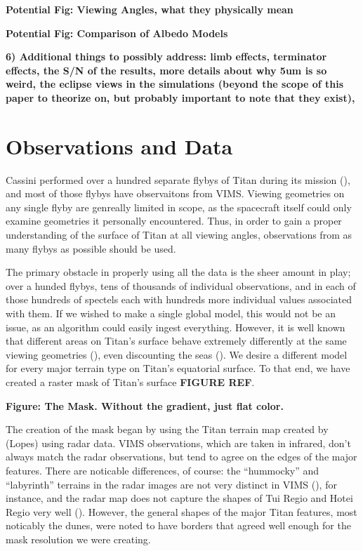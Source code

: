 \documentclass[twocolumn,linenumbers]{aastex631}
\begin{document}
\textbf{\color{blue}Potential Fig: Viewing Angles, what they physically mean\color{black}}

\textbf{\color{blue}Potential Fig: Comparison of Albedo Models\color{black}}

\textbf{\color{blue}6) Additional things to possibly address: limb effects, terminator effects, the S/N of the results, more details about why 5um is so weird, the eclipse views in the simulations (beyond the scope of this paper to theorize on, but probably important to note that they exist), \color{black}}

\section{Observations and Data} \label{sec:observe}

Cassini performed over a hundred separate flybys of Titan during its mission (), and most of those flybys have observaitons from VIMS. Viewing geometries on any single flyby are genreally limited in scope, as the spacecraft itself could only examine geometries it personally encountered. Thus, in order to gain a proper understanding of the surface of Titan at all viewing angles, observations from as many flybys as possible should be used. 

The primary obstacle in properly using all the data is the sheer amount in play; over a hunded flybys, tens of thousands of individual observations, and in each of those hundreds of spectels each with hundreds more individual values associated with them. If we wished to make a single global model, this would not be an issue, as an algorithm could easily ingest everything. However, it is well known that different areas on Titan's surface behave extremely differently at the same viewing geometries (), even discounting the seas (). We desire a different model for every major terrain type on Titan's equatorial surface. To that end, we have created a raster mask of Titan's surface \textbf{\color{blue}FIGURE REF\color{black}}.

\textbf{\color{blue}Figure: The Mask. Without the gradient, just flat color. \color{black}}

The creation of the mask began by using the Titan terrain map created by (Lopes) using radar data. VIMS observations, which are taken in infrared, don't always match the radar observations, but tend to agree on the edges of the major features. There are noticable differences, of course: the ``hummocky'' and ``labyrinth'' terrains in the radar images are not very distinct in VIMS (), for instance, and the radar map does not capture the shapes of Tui Regio and Hotei Regio very well (). However, the  general shapes of the major Titan features, most noticably the dunes, were noted to have borders that agreed well enough for the mask resolution we were creating.
\end{document}
